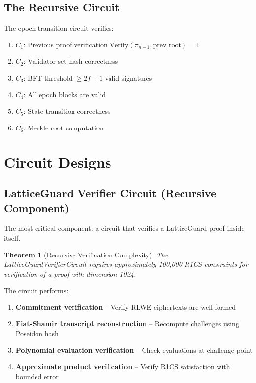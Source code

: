 \documentclass[11pt,a4paper]{article}
\newtheorem{theorem}{Theorem}[section]
\begin{document}
\subsection{The Recursive Circuit}

The epoch transition circuit verifies:
\begin{enumerate}
    \item $C_1$: Previous proof verification $\text{Verify}(\pi_{n-1}, \text{prev\_root}) = 1$
    \item $C_2$: Validator set hash correctness
    \item $C_3$: BFT threshold $\geq 2f+1$ valid signatures
    \item $C_4$: All epoch blocks are valid
    \item $C_5$: State transition correctness
    \item $C_6$: Merkle root computation
\end{enumerate}

\section{Circuit Designs}

\subsection{LatticeGuard Verifier Circuit (Recursive Component)}

The most critical component: a circuit that verifies a LatticeGuard proof inside itself.

\begin{theorem}[Recursive Verification Complexity]
The LatticeGuardVerifierCircuit requires approximately 100,000 R1CS constraints for verification of a proof with dimension 1024.
\end{theorem}

The circuit performs:
\begin{enumerate}
    \item \textbf{Commitment verification} -- Verify RLWE ciphertexts are well-formed
    \item \textbf{Fiat-Shamir transcript reconstruction} -- Recompute challenges using Poseidon hash
    \item \textbf{Polynomial evaluation verification} -- Check evaluations at challenge point
    \item \textbf{Approximate product verification} -- Verify R1CS satisfaction with bounded error
\end{enumerate}
\end{document}

